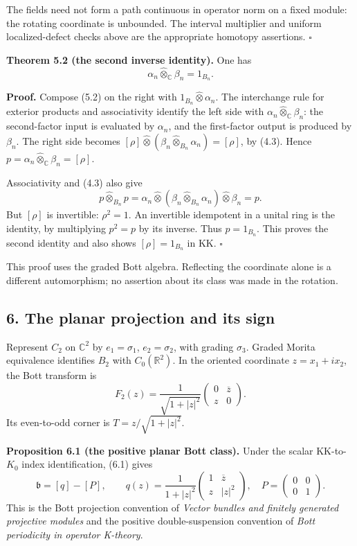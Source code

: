 \documentclass[
  11pt,
]{article}
\begin{document}
The fields need not form a path continuous in operator norm on a fixed
module: the rotating coordinate is unbounded. The interval multiplier
and uniform localized-defect checks above are the appropriate homotopy
assertions. \(\square\)

\textbf{Theorem 5.2 (the second inverse identity).} One has \[
\alpha_n\widehat\otimes_{\mathbb C}\beta_n=1_{B_n}.
\tag{5.5}
\]

\textbf{Proof.} Compose (5.2) on the right with
\(1_{B_n}\widehat\otimes\alpha_n\). The interchange rule for exterior
products and associativity identify the left side with
\(\alpha_n\widehat\otimes_{\mathbb C}\beta_n\): the second-factor input
is evaluated by \(\alpha_n\), and the first-factor output is produced by
\(\beta_n\). The right side becomes
\([\rho]\widehat\otimes(\beta_n\widehat\otimes_{B_n}\alpha_n)=[\rho]\),
by (4.3). Hence \(p=\alpha_n\widehat\otimes_{\mathbb C}\beta_n=[\rho]\).

Associativity and (4.3) also give \[
p\widehat\otimes_{B_n}p
=\alpha_n\widehat\otimes
(\beta_n\widehat\otimes_{B_n}\alpha_n)
\widehat\otimes\beta_n=p .
\] But \([\rho]\) is invertible: \(\rho^2=1\). An invertible idempotent
in a unital ring is the identity, by multiplying \(p^2=p\) by its
inverse. Thus \(p=1_{B_n}\). This proves the second identity and also
shows \([\rho]=1_{B_n}\) in KK. \(\square\)

This proof uses the graded Bott algebra. Reflecting the coordinate alone
is a different automorphism; no assertion about its class was made in
the rotation.

\subsection{6. The planar projection and its
sign}\label{the-planar-projection-and-its-sign}

Represent \(C_2\) on \(\mathbb C^2\) by \(e_1=\sigma_1\),
\(e_2=\sigma_2\), with grading \(\sigma_3\). Graded Morita equivalence
identifies \(B_2\) with \(C_0(\mathbb R^2)\). In the oriented coordinate
\(z=x_1+ix_2\), the Bott transform is \[
F_2(z)=\frac1{\sqrt{1+|z|^2}}
\begin{pmatrix}0&\overline z\\z&0\end{pmatrix}.
\tag{6.1}
\] Its even-to-odd corner is \(T=z/\sqrt{1+|z|^2}\).

\textbf{Proposition 6.1 (the positive planar Bott class).} Under the
scalar KK-to-\(K_0\) index identification, (6.1) gives \[
\mathfrak b=[q]-[P],\qquad
q(z)=\frac1{1+|z|^2}
\begin{pmatrix}1&\overline z\\z&|z|^2\end{pmatrix},
\quad P=\begin{pmatrix}0&0\\0&1\end{pmatrix}.
\tag{6.2}
\] This is the Bott projection convention of \emph{Vector bundles and
finitely generated projective modules} and the positive
double-suspension convention of \emph{Bott periodicity in operator
K-theory}.
\end{document}
